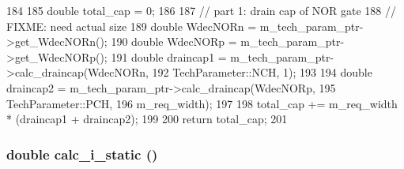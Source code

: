 \begin{DoxyCode}
184 {
185     double total_cap = 0;
186 
187     // part 1: drain cap of NOR gate
188     // FIXME: need actual size
189     double WdecNORn = m_tech_param_ptr->get_WdecNORn();
190     double WdecNORp = m_tech_param_ptr->get_WdecNORp();
191     double draincap1 = m_tech_param_ptr->calc_draincap(WdecNORn, 
192                                                        TechParameter::NCH, 1);
193 
194     double draincap2 = m_tech_param_ptr->calc_draincap(WdecNORp, 
195                                                        TechParameter::PCH, 
196                                                        m_req_width);
197 
198     total_cap += m_req_width * (draincap1 + draincap2);
199 
200     return total_cap;
201 }
\end{DoxyCode}
\hypertarget{classMatrixArbiter_a0027807356ac4ca07fe2e593234eb884}{
\subsubsection[{calc\_\-i\_\-static}]{\setlength{\rightskip}{0pt plus 5cm}double calc\_\-i\_\-static ()}}
\label{classMatrixArbiter_a0027807356ac4ca07fe2e593234eb884}



